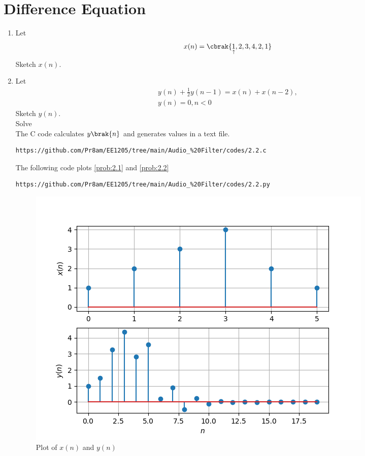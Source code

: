 \documentclass[journal,12pt,twocolumn]{IEEEtran}
\theoremstyle{remark}
\begin{document}
\section{Difference Equation}
\begin{enumerate}[label=\thesection.\arabic*,ref=\thesection.\theenumi]
\item Let
\begin{equation}
x(n) = \cbrak{\underset{\uparrow}{1},2,3,4,2,1} \label{prob:2.1}
\end{equation}
Sketch $x(n)$. 
\item Let
\begin{multline}
y(n) + \frac{1}{2}y(n-1) = x(n) + x(n-2), 
\\
y(n) = 0, n < 0 \label{prob:2.2}
\end{multline}
Sketch $y(n)$.\\
Solve\\
\solution  The C code calculates $y\brak{n}$ and generates values in a text file.
\begin{lstlisting}
https://github.com/Pr8am/EE1205/tree/main/Audio_%20Filter/codes/2.2.c
\end{lstlisting} 
The following code plots \eqref{prob:2.1} and \eqref{prob:2.2}
\begin{lstlisting}
https://github.com/Pr8am/EE1205/tree/main/Audio_%20Filter/codes/2.2.py
\end{lstlisting}

\begin{figure}[H]
	\centering
	\includegraphics[width=\columnwidth]{figs/Plot_xn_yn.png}
	\caption{Plot of $x(n)$ and $y(n)$}
	\label{fig:xnyn}
\end{figure}
\end{enumerate}
\end{document}
